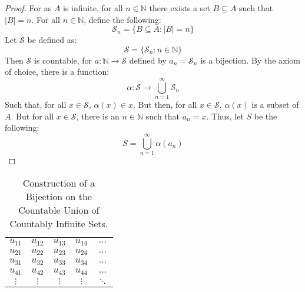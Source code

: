        \begin{proof}
            For as $A$ is infinite, for all $n\in\mathbb{N}$
            there exists a set $B\subseteq{A}$ such that
            $|B|=n$. For all $n\in\mathbb{N}$,
            define the following:
            \begin{equation}
                \mathcal{S}_{n}=\{B\subseteq{A}:|B|=n\}
            \end{equation}
            Let $\mathcal{S}$ be defined as:
            \begin{equation}
                \mathcal{S}=\{\mathcal{S}_{n}:n\in\mathbb{N}\}
            \end{equation}
            Then $\mathcal{S}$ is countable, for
            $a:\mathbb{N}\rightarrow\mathcal{S}$ defined
            by $a_{n}=\mathcal{S}_{n}$ is a bijection.
            By the axiom of choice, there is a function:
            \begin{equation}
                \alpha:\mathcal{S}\rightarrow
                \bigcup_{n=1}^{\infty}\mathcal{S}_{n}
            \end{equation}
            Such that, for all $x\in\mathcal{S}$,
            $\alpha(x)\in{x}$. But then, for all
            $x\in\mathcal{S}$, $\alpha(x)$ is a subset
            of $A$. But for all $x\in\mathcal{S}$, there
            is an $n\in\mathbb{N}$ such that
            $a_{n}=x$. Thus, let $S$ be the following:
            \begin{equation}
                S=\bigcup_{n=1}^{\infty}\alpha(a_{n})
            \end{equation}
        \end{proof}
        \begin{table}[H]
            \captionsetup{type=table}
            \centering
            \begin{tabular}{ccccc}
                $u_{11}$&$u_{12}$&$u_{13}$
                &$u_{14}$&$\hdots$\\
                $u_{21}$&$u_{22}$&$u_{23}$
                &$u_{24}$&$\hdots$\\
                $u_{31}$&$u_{32}$&$u_{33}$
                &$u_{34}$&$\hdots$\\
                $u_{41}$&$u_{42}$&$u_{43}$
                &$u_{44}$&$\hdots$\\
                $\vdots$&$\vdots$&$\vdots$
                &$\vdots$&$\ddots$
            \end{tabular}
            \caption{Construction of a Bijection on the
                     Countable Union of Countably Infinite
                     Sets.}
            \label{table:Countable_Union_of_Countable}
        \end{table}
